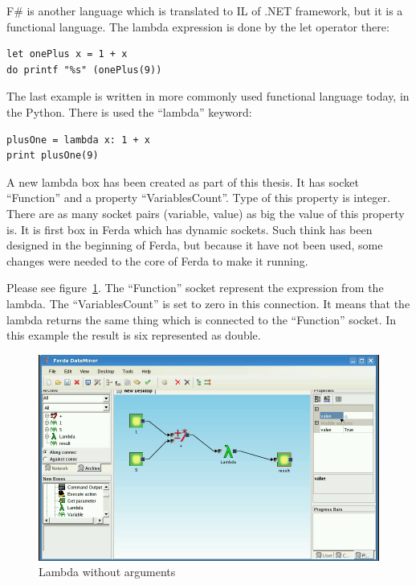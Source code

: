 \documentclass[a4paper,12pt]{book}
\begin{document}
F\# is another language which is translated to IL of .NET framework, but it is a functional language. The lambda expression is done by the let operator there:
\begin{verbatim}
let onePlus x = 1 + x
do printf "%s" (onePlus(9)) 
\end{verbatim}

The last example is written in more commonly used functional language today, in the Python. There is used the ``lambda'' keyword:
\begin{verbatim}
plusOne = lambda x: 1 + x
print plusOne(9)
\end{verbatim}

A new lambda box has been created as part of this thesis. It has socket ``Function'' and a property ``VariablesCount''. Type of this property is integer. There are as many socket pairs (variable, value) as big the value of this property is. It is first box in Ferda which has dynamic sockets. Such think has been designed in the beginning of Ferda, but because it have not been used, some changes were needed to the core of Ferda to make it running.

Please see figure~\ref{fig:boxLambdaBasic}. The ``Function'' socket represent the expression from the lambda. The ``VariablesCount'' is set to zero in this connection. It means that the lambda returns the same thing which is connected to the ``Function'' socket. In this example the result is six represented as double. 
\begin{figure}
	\includegraphics[width=1\textwidth]{lambdaBasic2.png}
	\caption{Lambda without arguments}
	\label{fig:boxLambdaBasic}
\end{figure}
\end{document}
